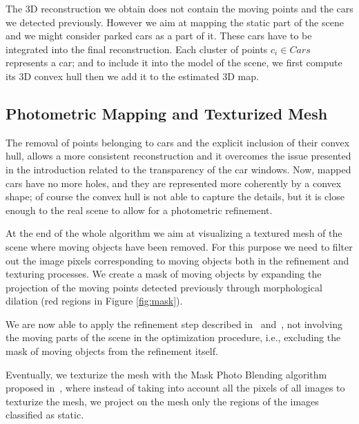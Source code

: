 The 3D reconstruction we obtain does not contain the moving points and the cars we detected previously. 
However we aim at mapping the static part of the scene and we might consider parked cars as a part of it.
These cars have to be integrated into the final reconstruction. 
Each cluster of points $c_i \in Cars$ represents a car; and to include it into the model of the scene, we first compute its 3D convex hull then we add it to the estimated 3D map.

\subsection{Photometric Mapping and Texturized Mesh}
The removal of points belonging to cars and the explicit inclusion of their convex hull, allows a more consistent reconstruction and it overcomes the issue presented in the introduction related to the transparency of the car windows. Now, mapped cars have no more holes, and they are represented more coherently by a convex shape; of course the convex hull is not able to capture the details, but it is close enough to the real scene to allow for a photometric refinement.

At the end of the whole algorithm we aim at visualizing a textured mesh of the scene where moving objects have been removed. 
For this purpose we need to filter out the image pixels corresponding to moving objects both in the refinement and texturing processes.
We create a mask of moving objects by expanding the projection of the moving points detected previously through morphological dilation (red regions in Figure \ref{fig:mask}). 

We are now able to apply the refinement step described in~\cite{vu_et_al_2012} and~\cite{romanoni16}, not involving the moving parts of the scene in the optimization procedure, i.e., excluding the mask of moving objects from the refinement itself.

Eventually, we texturize the mesh with the Mask Photo Blending algorithm proposed in~\cite{callieri2008masked}, where instead of taking into account all the pixels of all images to texturize the mesh, we project on the mesh only the regions of the images classified as static. 

